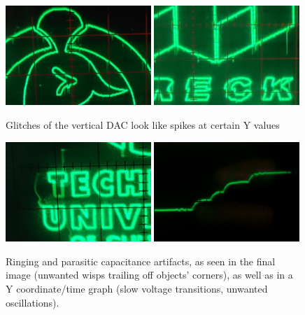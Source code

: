 \documentclass[12pt]{article}
\begin{document}
\begin{figure}[p]
\centering
\includegraphics[width=0.49\textwidth]{images/vertical-dac-glitches1.png}\hspace{0.01\textwidth}
\includegraphics[width=0.49\textwidth]{images/vertical-dac-glitches2.png}
\caption{Glitches of the vertical DAC look like spikes at certain Y values}
\label{fig:vertical-dac-glitches}
\end{figure}

\begin{figure}[p]
\centering
\includegraphics[width=0.49\textwidth]{images/ringing-2d.png}\hspace{0.01\textwidth}
\includegraphics[width=0.49\textwidth]{images/ringing-1d.png}
\caption{Ringing and parasitic capacitance artifacts, as seen in the final image (unwanted wisps trailing off objects' corners), as well as in a Y coordinate/time graph (slow voltage transitions, unwanted oscillations).}
\label{fig:ringing}
\end{figure}
\end{document}
